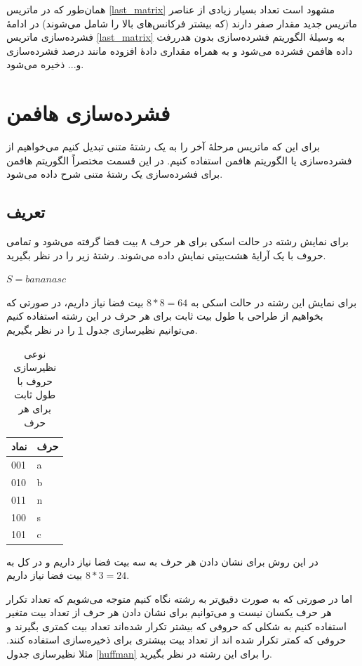 همان‌طور که در ماتریس 
\ref{last_matrix}
مشهود است تعداد بسیار زیادی از عناصر ماتریس جدید
مقدار صفر دارند (که بیشتر فرکانس‌های بالا را شامل می‌شوند)
در ادامهٔ فشرده‌سازی ماتریس 
\ref{last_matrix}
به وسیلهٔ الگوریتم فشرده‌‌سازی بدون هدررفت داده
هافمن 
فشرده می‌شود و به همراه مقداری 
دادهٔ افزوده 
مانند درصد فشرده‌سازی و... ذخیره می‌شود. 

\section{فشرده‌سازی هافمن }
برای این که ماتریس مرحلهٔ آخر را به یک رشتهٔ متنی تبدیل کنیم می‌خواهیم از 
فشرده‌سازی یا الگوریتم هافمن استفاده کنیم.
در این قسمت مختصراً الگوریتم هافمن برای فشرده‌سازی یک رشتهٔ متنی شرح داده می‌شود.

\subsection{تعریف}
برای نمایش رشته در حالت 
اسکی
برای هر حرف ۸ بیت فضا گرفته می‌شود و تمامی حروف با یک آرایهٔ هشت‌بیتی
نمایش داده می‌شوند. رشتهٔ زیر را در نظر بگیرید.
\begin{center}
        $S = bananasc$
\end{center}

برای نمایش این رشته در حالت اسکی به 
$ 8 * 8 = 64$ 
بیت فضا نیاز داریم، در صورتی که بخواهیم از طراحی 
با طول بیت ثابت برای هر حرف در این رشته استفاده کنیم می‌توانیم نظیرسازی 
جدول
\ref{huffman_fixed}
 را در نظر بگیریم. 

\begin{table}[H]
        \centering
        \caption{نوعی نظیرسازی حروف با طول ثابت برای هر حرف}
        \label{huffman_fixed}
        \begin{tabular}{ll}
        \hline
        نماد & حرف \\ \hline
        001 & a \\
        010 & b \\
        011 & n \\
        100 & s \\
        101 & c \\ \hline
        \end{tabular}
\end{table}

در این روش برای نشان دادن هر حرف به سه بیت فضا نیاز داریم و در کل به
$ 8 * 3 = 24 $
بیت فضا نیاز داریم. 

اما در صورتی که به صورت دقیق‌تر به رشته نگاه کنیم متوجه می‌شویم که تعداد تکرار هر حرف
یکسان نیست و می‌توانیم برای نشان دادن هر حرف از تعداد بیت متغیر استفاده کنیم به شکلی که 
حروفی که بیشتر تکرار شده‌اند تعداد بیت کمتری بگیرند و حروفی که کمتر تکرار
شده اند از تعداد بیت بیشتری برای ذخیره‌‌سازی استفاده کنند. مثلا نظیرسازی جدول
\ref{huffman} 
را برای این رشته در نظر بگیرید.

